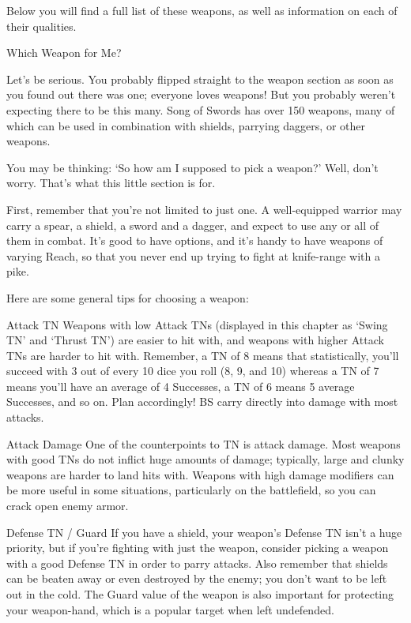 \documentclass[oneside,11pt,english]{book}
\begin{document}
Below you will find a full list of these weapons, as well as information on each of their qualities. 

 

Which Weapon for Me? 

 

Let’s be serious. You probably flipped straight to the weapon section as soon as you found out there was 
one; everyone loves weapons! But you probably weren’t expecting there to be this many. Song of Swords 
has over 150 weapons, many of which can be used in combination with shields, parrying daggers, or other 
weapons. 

 

You may be thinking: ‘So how am I supposed to pick a weapon?’ Well, don’t worry. That’s what this 
little section is for. 


 

First, remember that you’re not limited to just one. A well-equipped warrior may carry a spear, a shield, a 
sword and a dagger, and expect to use any or all of them in combat. It’s good to have options, and it’s 
handy to have weapons of varying Reach, so that you never end up trying to fight at knife-range with a 
pike. 

 

Here are some general tips for choosing a weapon: 

 

Attack TN 
Weapons with low Attack TNs (displayed in this chapter as ‘Swing TN’ and ‘Thrust TN’) are easier to hit 
with, and weapons with higher Attack TNs are harder to hit with. Remember, a TN of 8 means that 
statistically, you’ll succeed with 3 out of every 10 dice you roll (8, 9, and 10) whereas a TN of 7 means 
you’ll have an average of 4 Successes, a TN of 6 means 5 average Successes, and so on. Plan 
accordingly! BS carry directly into damage with most attacks. 

 

Attack Damage 
One of the counterpoints to TN is attack damage. Most weapons with good TNs do not inflict huge 
amounts of damage; typically, large and clunky weapons are harder to land hits with. Weapons with high 
damage modifiers can be more useful in some situations, particularly on the battlefield, so you can crack 
open enemy armor. 

 

Defense TN / Guard 
If you have a shield, your weapon’s Defense TN isn’t a huge priority, but if you’re fighting with just the 
weapon, consider picking a weapon with a good Defense TN in order to parry attacks. Also remember 
that shields can be beaten away or even destroyed by the enemy; you don’t want to be left out in the cold. 
The Guard value of the weapon is also important for protecting your weapon-hand, which is a popular 
target when left undefended. 
\end{document}
